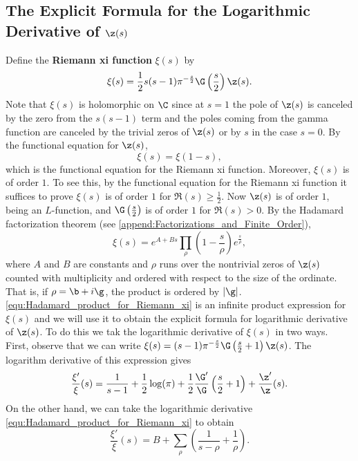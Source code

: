     \subsection*{The Explicit Formula for the Logarithmic Derivative of \texorpdfstring{$\z(s)$}{\z(s)}}
      Define the \textbf{Riemann xi function} $\xi(s)$ by
      \[
        \xi(s) = \frac{1}{2}s(s-1)\pi^{-\frac{s}{2}}\G\left(\frac{s}{2}\right)\z(s).
      \]
      Note that $\xi(s)$ is holomorphic on $\C$ since at $s = 1$ the pole of $\z(s)$ is canceled by the zero from the $s(s-1)$ term and the poles coming from the gamma function are canceled by the trivial zeros of $\z(s)$ or by $s$ in the case $s = 0$. By the functional equation for $\z(s)$,
      \[
        \xi(s) = \xi(1-s),
      \]
      which is the functional equation for the Riemann xi function. Moreover, $\xi(s)$ is of order $1$. To see this, by the functional equation for the Riemann xi function it suffices to prove $\xi(s)$ is of order $1$ for $\Re(s) \ge \frac{1}{2}$. Now $\z(s)$ is of order $1$, being an $L$-function, and $\G\left(\frac{s}{2}\right)$ is of order $1$ for $\Re(s) > 0$. By the Hadamard factorization theorem (see \cref{append:Factorizations_and_Finite_Order}),
      \begin{equation}\label{equ:Hadamard_product_for_Riemann_xi}
        \xi(s) = e^{A+Bs}\prod_{\rho}\left(1-\frac{s}{\rho}\right)e^{\frac{s}{\rho}},
      \end{equation}
      where $A$ and $B$ are constants and $\rho$ runs over the nontrivial zeros of $\z(s)$ counted with multiplicity and ordered with respect to the size of the ordinate. That is, if $\rho = \b+i\g$, the product is ordered by $|\g|$. \cref{equ:Hadamard_product_for_Riemann_xi} is an infinite product expression for $\xi(s)$ and we will use it to obtain the explicit formula for logarithmic derivative of $\z(s)$. To do this we tak the logarithmic derivative of $\xi(s)$ in two ways. First, observe that we can write $\xi(s) = (s-1)\pi^{-\frac{s}{2}}\G\left(\frac{s}{2}+1\right)\z(s)$. The logarithm derivative of this expression gives
      \begin{equation}\label{equ:logarithmic_derivative_Riemann_xi_1}
        \frac{\xi'}{\xi}(s) = \frac{1}{s-1}+\frac{1}{2}\log(\pi)+\frac{1}{2}\frac{\G'}{\G}\left(\frac{s}{2}+1\right)+\frac{\z'}{\z}(s).
      \end{equation}
      On the other hand, we can take the logarithmic derivative \cref{equ:Hadamard_product_for_Riemann_xi} to obtain
      \begin{equation}\label{equ:logarithmic_derivative_Riemann_xi_2}
        \frac{\xi'}{\xi}(s) = B+\sum_{\rho}\left(\frac{1}{s-\rho}+\frac{1}{\rho}\right).
      \end{equation}
